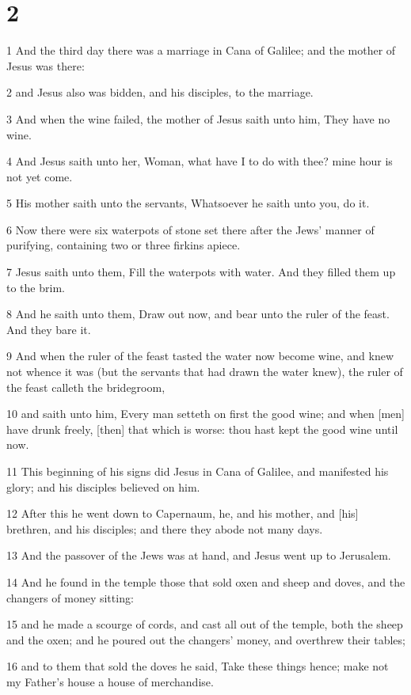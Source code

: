 \chapter{2}

\par 1 And the third day there was a marriage in Cana of Galilee; and the mother of Jesus was there:
\par 2 and Jesus also was bidden, and his disciples, to the marriage.
\par 3 And when the wine failed, the mother of Jesus saith unto him, They have no wine.
\par 4 And Jesus saith unto her, Woman, what have I to do with thee? mine hour is not yet come.
\par 5 His mother saith unto the servants, Whatsoever he saith unto you, do it.
\par 6 Now there were six waterpots of stone set there after the Jews' manner of purifying, containing two or three firkins apiece.
\par 7 Jesus saith unto them, Fill the waterpots with water. And they filled them up to the brim.
\par 8 And he saith unto them, Draw out now, and bear unto the ruler of the feast. And they bare it.
\par 9 And when the ruler of the feast tasted the water now become wine, and knew not whence it was (but the servants that had drawn the water knew), the ruler of the feast calleth the bridegroom,
\par 10 and saith unto him, Every man setteth on first the good wine; and when [men] have drunk freely, [then] that which is worse: thou hast kept the good wine until now.
\par 11 This beginning of his signs did Jesus in Cana of Galilee, and manifested his glory; and his disciples believed on him.
\par 12 After this he went down to Capernaum, he, and his mother, and [his] brethren, and his disciples; and there they abode not many days.
\par 13 And the passover of the Jews was at hand, and Jesus went up to Jerusalem.
\par 14 And he found in the temple those that sold oxen and sheep and doves, and the changers of money sitting:
\par 15 and he made a scourge of cords, and cast all out of the temple, both the sheep and the oxen; and he poured out the changers' money, and overthrew their tables;
\par 16 and to them that sold the doves he said, Take these things hence; make not my Father's house a house of merchandise.
